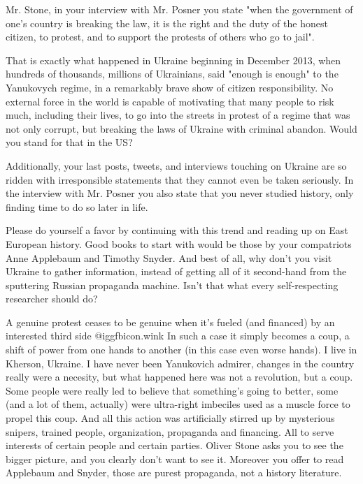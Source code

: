\begin{itemize} %


Mr. Stone, in your interview with Mr. Posner you state "when the government of
one's country is breaking the law, it is the right and the duty of the honest
citizen, to protest, and to support the protests of others who go to jail".

That is exactly what happened in Ukraine beginning in December 2013, when
hundreds of thousands, millions of Ukrainians, said "enough is enough" to the
Yanukovych regime, in a remarkably brave show of citizen responsibility. No
external force in the world is capable of motivating that many people to risk
much, including their lives, to go into the streets in protest of a regime that
was not only corrupt, but breaking the laws of Ukraine with criminal abandon.
Would you stand for that in the US? 

Additionally, your last posts, tweets, and interviews touching on Ukraine are
so ridden with irresponsible statements that they cannot even be taken
seriously. In the interview with Mr. Posner you also state that you never
studied history, only finding time to do so later in life.

Please do yourself a favor by continuing with this trend and reading up on East
European history. Good books to start with would be those by your compatriots
Anne Applebaum and Timothy Snyder. And best of all, why don't you visit Ukraine
to gather information, instead of getting all of it second-hand from the
sputtering Russian propaganda machine. Isn't that what every self-respecting
researcher should do?

\begin{itemize} %

A genuine protest ceases to be genuine when it's fueled (and financed) by an
interested third side  @igg{fbicon.wink}  In such a case it simply becomes a coup, a shift of
power from one hands to another (in this case even worse hands). I live in
Kherson, Ukraine. I have never been Yanukovich admirer, changes in the country
really were a necesity, but what happened here was not a revolution, but a
coup. Some people were really led to believe that something's going to better,
some (and a lot of them, actually) were ultra-right imbeciles used as a muscle
force to propel this coup. And all this action was artificially stirred up by
mysterious snipers, trained people, organization, propaganda and financing. All
to serve interests of certain people and certain parties. Oliver Stone asks you
to see the bigger picture, and you clearly don't want to see it. Moreover you
offer to read Applebaum and Snyder, those are purest propaganda, not a history
literature.


\end{itemize}
\end{itemize}
